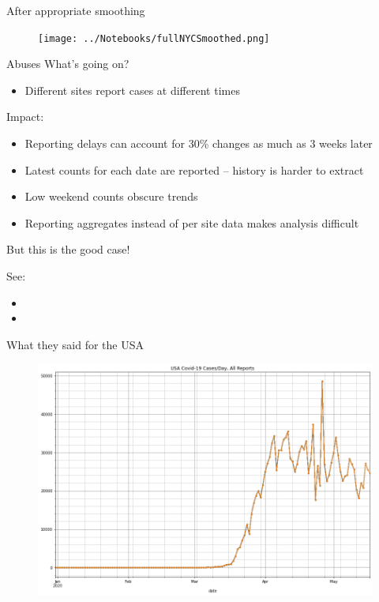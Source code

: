\documentclass[aspectratio=169]{beamer}
\begin{document}
\begin{frame}{After appropriate smoothing}
  \begin{figure}
    \centering
    \texttt{[image: ../Notebooks/fullNYCSmoothed.png]}
  \end{figure}

\end{frame}

\begin{frame}{Abuses}
  What's going on?
  \begin{itemize}
  \item Different sites report cases at different times
  \end{itemize}
  
  Impact:
  \begin{itemize}
  \item Reporting delays can account for 30\% changes as much as 3
    weeks later
  \item Latest counts for each date are reported -- history is harder
    to extract
  \item Low weekend counts obscure trends
  \item Reporting aggregates instead of per site data makes analysis difficult
  \end{itemize}

But this is the good case!

See:
\begin{itemize}
\item {}
\item {}
\end{itemize}
\end{frame}


\begin{frame}{What they said for the USA}
  \begin{figure}
    \centering
    \includegraphics[height=.8\textheight]{../Notebooks/USACasesPerDayRawNoLegend.png}
  \end{figure}
\end{frame}
\end{document}
